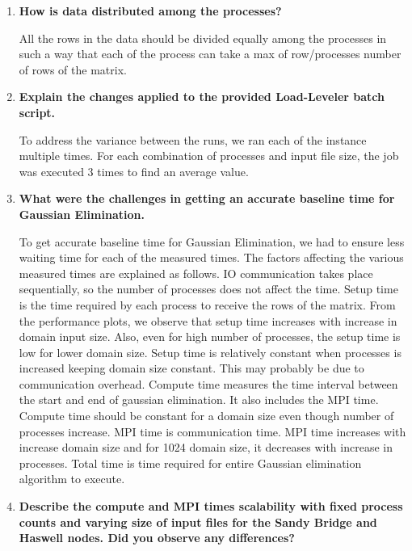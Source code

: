\documentclass[10pt, letterpaper, twoside]{article}
\begin{document}
\begin{titlepage}
\begin{enumerate}
\item\textbf{How is data distributed among the processes?} 

All the rows in the data should be divided equally among the processes in such a way that each of the process can take a max of row/processes number of rows of the matrix. 

\item \textbf{Explain the changes applied to the provided Load-Leveler batch script.} 

To address the variance between the runs, we ran each of the instance multiple times. For each combination of processes and input file size, the job was executed 3 times to find an average value.

\item \textbf{What were the challenges in getting an accurate baseline time for Gaussian Elimination.} 

To get accurate baseline time for Gaussian Elimination, we had to ensure less waiting time for each of the measured times. The factors affecting the various measured times are explained as follows. IO communication takes place sequentially, so the number of processes does not affect the time. Setup time is the time required by each process to receive the rows of the matrix. From the performance plots, we observe that setup time increases with increase in domain input size. Also, even for high number of processes, the setup time is low for lower domain size. Setup time is relatively constant when processes is increased keeping domain size constant. This may probably be due to communication overhead. Compute time measures the time interval between the start and end of gaussian elimination. It also includes the MPI time. Compute time should be constant for a domain size even though number of processes increase. MPI time is communication time. MPI time increases with increase domain size and for 1024 domain size, it decreases with increase in processes. Total time is time required for entire Gaussian elimination algorithm to execute.  

\item\textbf{Describe the compute and MPI times scalability with fixed process counts and varying size of input files for the Sandy Bridge and Haswell nodes. Did you observe any differences?}
 

\end{enumerate}
\end{titlepage}
\end{document}
